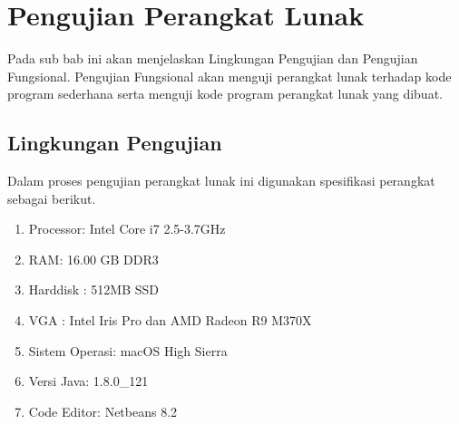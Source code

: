%
%
%
%
%
%

\section{Pengujian Perangkat Lunak}
\label{sec: pengujian perangkat lunak}
Pada sub bab ini akan menjelaskan Lingkungan Pengujian dan Pengujian Fungsional. Pengujian Fungsional akan menguji perangkat lunak terhadap kode program sederhana serta menguji kode program perangkat lunak yang dibuat.%
\subsection{Lingkungan Pengujian}
\label{sec:lingkungan perangkat lunak}
Dalam proses pengujian perangkat lunak ini digunakan spesifikasi perangkat sebagai berikut.

\begin{enumerate}
	\item Processor: Intel Core i7 2.5-3.7GHz 
	\item RAM: 16.00 GB DDR3	
	\item Harddisk : 512MB SSD
	\item VGA : Intel Iris Pro dan AMD Radeon R9 M370X
	\item Sistem Operasi: macOS High Sierra
	\item Versi Java: 1.8.0\_121
	\item Code Editor: Netbeans 8.2
\end{enumerate}

